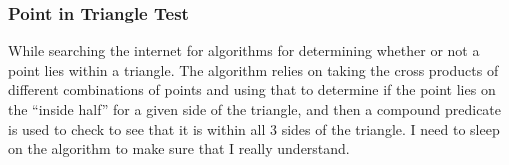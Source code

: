 \documentclass[letterpaper,oneside,titlepage]{article}
\begin{document}
\subsubsection{Point in Triangle Test}

While searching the internet for algorithms for determining whether or not a point lies within a triangle.  The algorithm relies on taking the cross products of different combinations of points and using that to determine if the point lies on the ``inside half'' for a given side of the triangle, and then a compound predicate is used to check to see that it is within all 3 sides of the triangle.  I need to sleep on the algorithm to make sure that I really understand.




\end{document}
